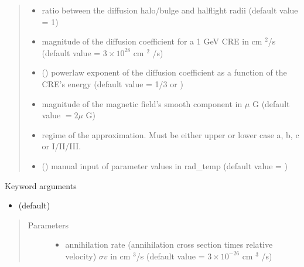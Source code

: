 \documentclass[letterpaper,10pt,english]{sphinxmanual}
\begin{document}
\begin{fulllineitems}
\begin{quote}
\begin{description}
\begin{itemize}
\item {} 
\sphinxAtStartPar
{} \textendash{} ratio between the diffusion halo/bulge and half\sphinxhyphen{}light radii (default value = 1)

\item {} 
\sphinxAtStartPar
{} \textendash{} magnitude of the diffusion coefficient for a 1 GeV CRE in cm \({}^2\)/s (default value = \(3\times 10^{28}\) cm \({}^2\) /s)

\item {} 
\sphinxAtStartPar
{} (\sphinxstyleliteralemphasis{\sphinxupquote{, }}) \textendash{} power\sphinxhyphen{}law exponent of the diffusion coefficient as a function of the CRE’s energy (default value = 1/3 or )

\item {} 
\sphinxAtStartPar
{} \textendash{} magnitude of the magnetic field’s smooth component in \(\mu\) G (default value \(= 2 \mu\) G)

\item {} 
\sphinxAtStartPar
{} \textendash{} regime of the approximation. Must be either upper or lower case a, b, c or I/II/III.

\item {} 
\sphinxAtStartPar
{} () \textendash{} manual input of parameter values in rad\_temp (default value = )

\end{itemize}

\end{description}\end{quote}

\sphinxAtStartPar
Keyword arguments
\begin{itemize}
\item {} 
\sphinxAtStartPar
{}    (default)

\end{itemize}
\begin{quote}\begin{description}
\item[{Parameters}] \leavevmode\begin{itemize}
\item {} 
\sphinxAtStartPar
{} \textendash{} annihilation rate (annihilation cross section times relative velocity) \(\sigma v\) in cm \({}^3\)/s (default value = \(3 \times 10^{-26}\) cm \({}^3\) /s)


\end{itemize}
\end{description}
\end{quote}
\end{fulllineitems}
\end{document}
